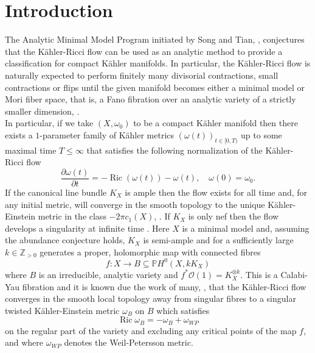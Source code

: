 \documentclass[12pt]{article}
\numberwithin{equation}{section}
\newcommand{\Z}{\mathbb{Z}}
\renewcommand{\P}{\mathbb{P}}
\newcommand{\OO}{\mathcal{O}}
\renewcommand{\d}{\partial}
\DeclareMathOperator{\Ric}{Ric}
\begin{document}
\section{Introduction}
The Analytic Minimal Model Program initiated by Song and Tian, \cite{ST07,ST12,BEG13,ZZ20,JST23}, conjectures that the K\"ahler-Ricci flow can be used as an analytic method to provide a classification for compact K\"ahler manifolds. In particular, the K\"ahler-Ricci flow is naturally expected to perform finitely many divisorial contractions, small contractions or flips until the given manifold becomes either a minimal model or Mori fiber space, that is, a Fano fibration over an analytic variety of a strictly smaller dimension, \cite{BEG13,JST23}.\\
In particular, if we take $(X,\omega_0)$ to be a compact K\"ahler manifold then there exists a $1$-parameter family of K\"ahler metrics $(\omega(t))_{t\in [0,T)}$ up to some maximal time $T \leq \infty$ that satisfies the following normalization of the K\"ahler-Ricci flow
\begin{equation*}
    \frac{\d \omega(t)}{\d t} = -\Ric (\omega(t)) - \omega(t), \quad \omega(0) = \omega_0.
\end{equation*}
If the canonical line bundle $K_X$ is ample then the flow exists for all time and, for any initial metric, will converge in the smooth topology to the unique K\"ahler-Einstein metric in the class $-2 \pi c_1(X)$, \cite{C85}. If $K_X$ is only nef then the flow develops a singularity at infinite time \cite{TZ06}. Here $X$ is a minimal model and, assuming the abundance conjecture holds, $K_X$ is semi-ample and for a sufficiently large $k \in \Z_{>0}$ generates a proper, holomorphic map with connected fibres 
\begin{equation*}
    f: X \to B \subseteq \P H^0(X,kK_X)
\end{equation*}
where $B$ is an irreducible, analytic variety and $f^* \OO(1) = K_X^{\otimes k}$. This is a Calabi-Yau fibration and it is known due the work of many, \cite{ST07,ST12,TWY18,T19,HLT24}, that the K\"ahler-Ricci flow converges in the smooth local topology away from singular fibres to a singular twisted K\"ahler-Einstein metric $\omega_{B}$ on $B$ which satisfies
\begin{equation*}
    \Ric \omega_B = -\omega_B + \omega_{WP}
\end{equation*}
on the regular part of the variety and excluding any critical points of the map $f$, and where $\omega_{WP}$ denotes the Weil-Petersson metric.\\
\end{document}
